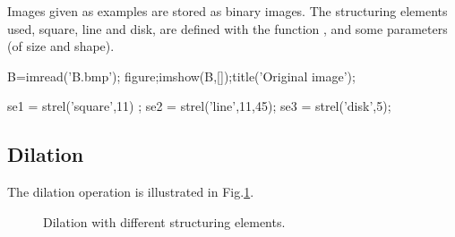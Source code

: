 \def\QRCODE{TB_IPR_TUT.IMG.binary_morphological_reconstruction_matlabqrcode.png}
\def\QRPAGE{http://www.iptutorials.science/tree/master/TB_IPR/TUT.IMG.binary_morphological_reconstruction/matlab}


Images given as examples are stored as binary images. The structuring elements used, square, line and disk, are defined with the \matlabregistered{} function , and some parameters (of size and shape).

\begin{matlab}
B=imread('B.bmp');
figure;imshow(B,[]);title('Original image');

se1 = strel('square',11) ;     %
se2 = strel('line',11,45);     %
se3 = strel('disk',5);        %
\end{matlab}

\subsection{Dilation}
The dilation operation is illustrated in Fig.\ref{fig:matlab:morphology_reconstruction:dilation}.

\begin{figure}[htbp]
 \centering
 \hfill
 \hfill
 \caption{Dilation with different structuring elements.}
 \label{fig:matlab:morphology_reconstruction:dilation}
\end{figure}
  
